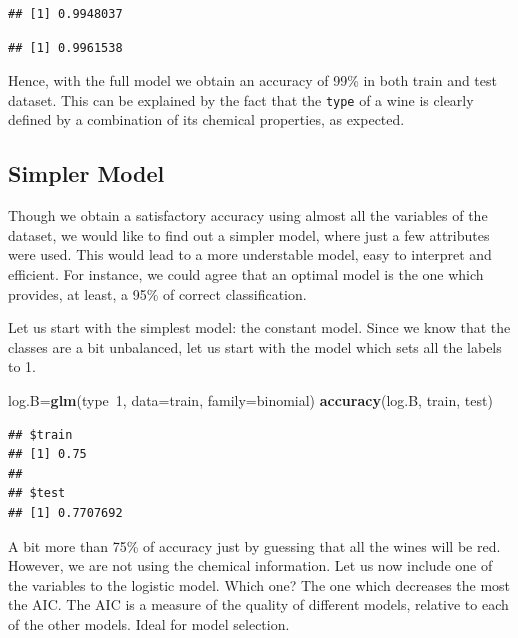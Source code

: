 \documentclass[12pt,]{article}
\newenvironment{Shaded}{\begin{snugshade}}{\end{snugshade}}
\newcommand{\KeywordTok}[1]{\textcolor[rgb]{0.13,0.29,0.53}{\textbf{{#1}}}}
\newcommand{\DataTypeTok}[1]{\textcolor[rgb]{0.13,0.29,0.53}{{#1}}}
\newcommand{\DecValTok}[1]{\textcolor[rgb]{0.00,0.00,0.81}{{#1}}}
\newcommand{\NormalTok}[1]{{#1}}
\begin{document}
\begin{verbatim}
## [1] 0.9948037
\end{verbatim}

\begin{Shaded}
\end{Shaded}

\begin{verbatim}
## [1] 0.9961538
\end{verbatim}

Hence, with the full model we obtain an accuracy of 99\% in both train
and test dataset. This can be explained by the fact that the
\texttt{type} of a wine is clearly defined by a combination of its
chemical properties, as expected.

\subsection{Simpler Model}\label{simpler-model}

Though we obtain a satisfactory accuracy using almost all the variables
of the dataset, we would like to find out a simpler model, where just a
few attributes were used. This would lead to a more understable model,
easy to interpret and efficient. For instance, we could agree that an
optimal model is the one which provides, at least, a 95\% of correct
classification.

Let us start with the simplest model: the constant model. Since we know
that the classes are a bit unbalanced, let us start with the model which
sets all the labels to 1.

\begin{Shaded}
\begin{Highlighting}[]
\NormalTok{log.B=}\KeywordTok{glm}\NormalTok{(type~}\DecValTok{1}\NormalTok{, }\DataTypeTok{data=}\NormalTok{train, }\DataTypeTok{family=}\NormalTok{binomial)}
\KeywordTok{accuracy}\NormalTok{(log.B, train, test)}
\end{Highlighting}
\end{Shaded}

\begin{verbatim}
## $train
## [1] 0.75
## 
## $test
## [1] 0.7707692
\end{verbatim}

A bit more than 75\% of accuracy just by guessing that all the wines
will be red. However, we are not using the chemical information. Let us
now include one of the variables to the logistic model. Which one? The
one which decreases the most the AIC. The AIC is a measure of the
quality of different models, relative to each of the other models. Ideal
for model selection.
\end{document}
